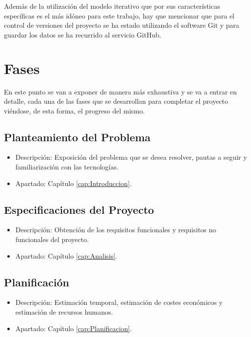 Además de la utilización del modelo iterativo que por sus características específicas es el más idóneo para este trabajo, hay que mencionar que para el control de versiones del proyecto se ha estado utilizando el software Git y para guardar los datos se ha recurrido al servicio GitHub.

\section{Fases}
En este punto se van a exponer de manera más exhaustiva y se va a entrar en detalle, cada una de las fases que se desarrollan para completar el proyecto viéndose, de esta forma, el progreso del mismo.

\subsection{Planteamiento del Problema}
\begin{itemize}
  \item Descripción: Exposición del problema que se desea resolver, pautas a seguir y familiarización con las tecnologías.
  \item Apartado: Capítulo \ref{cap:Introduccion}.\\
\end{itemize}

\subsection{Especificaciones del Proyecto}
\begin{itemize}
  \item Descripción: Obtención de los requisitos funcionales y requisitos no funcionales del proyecto.
  \item Apartado: Capítulo \ref{cap:Analisis}.\\
\end{itemize}

\subsection{Planificación}
\begin{itemize}
  \item Descripción: Estimación temporal, estimación de costes económicos y estimación de recursos humanos.
  \item Apartado: Capítulo \ref{cap:Planificacion}.\\
\end{itemize}

